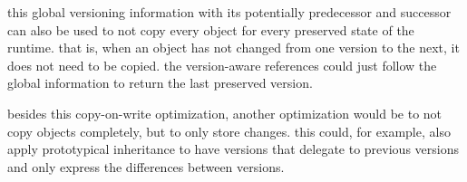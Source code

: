 this global versioning information with its potentially predecessor and successor can also be used to not copy every object for every preserved state of the runtime.
that is, when an object has not changed from one version to the next, it does not need to be copied.
the version-aware references could just follow the global information to return the last preserved version.

besides this copy-on-write optimization, another optimization would be to not copy objects completely, but to only store changes.
this could, for example, also apply prototypical inheritance to have versions that delegate to previous versions and only express the differences between versions.